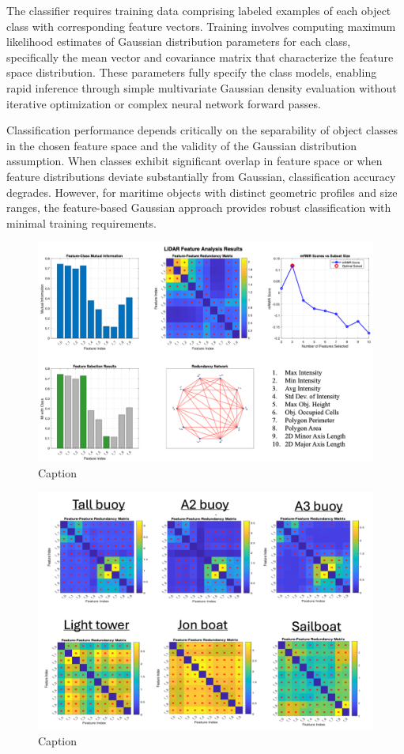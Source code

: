 \documentclass[../main.tex]{subfiles}
\begin{document}
The classifier requires training data comprising labeled examples of each object class with corresponding feature vectors.
Training involves computing maximum likelihood estimates of Gaussian distribution parameters for each class, specifically the mean vector and covariance matrix that characterize the feature space distribution.
These parameters fully specify the class models, enabling rapid inference through simple multivariate Gaussian density evaluation without iterative optimization or complex neural network forward passes.

Classification performance depends critically on the separability of object classes in the chosen feature space and the validity of the Gaussian distribution assumption.
When classes exhibit significant overlap in feature space or when feature distributions deviate substantially from Gaussian, classification accuracy degrades.
However, for maritime objects with distinct geometric profiles and size ranges, the feature-based Gaussian approach provides robust classification with minimal training requirements.

\begin{figure}
    \centering
    \includegraphics[width=0.95\linewidth]{Images/MI_analysis.png}
    \caption{Caption}
    \label{fig:MI_analysis}
\end{figure}

\begin{figure}
    \centering
    \includegraphics[width=0.95\linewidth]{Images/MI_pairwise.png}
    \caption{Caption}
    \label{fig:MI_pairwise}
\end{figure}

\end{document}
